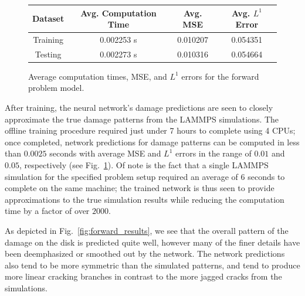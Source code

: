 \begin{figure}
  \centering
  \begin{tabular}{c|c|c|c}
    Dataset  &  Avg. Computation Time  & Avg. MSE &  Avg. $L^1$ Error \\ \hline
    Training &    0.002253 s &    0.010207  &   0.054351  \\ 
    Testing  &    0.002273 s &    0.010316  &   0.054664  
  \end{tabular}
  \caption{Average computation times, MSE, and $L^1$ errors for the forward problem model.}
  \label{fig:forward_results_table}
\end{figure}


After training, the neural network's damage predictions are seen to closely approximate the true damage patterns from the LAMMPS simulations.  The offline training procedure required just under 7 hours to complete using 4 CPUs; once completed, network predictions for damage patterns can be computed in less than $0.0025$ seconds with average MSE and $L^1$ errors in the range of $0.01$ and $0.05$, respectively (see Fig.~\ref{fig:forward_results_table}).  Of note is the fact that a single LAMMPS simulation for the specified problem setup required an average of $6$ seconds to complete on the same machine;  the trained network is thus seen to  provide approximations to the true simulation results while reducing the computation time  by a factor of over $2000$.

As depicted in Fig.~\ref{fig:forward_results}, we see that the overall pattern of the damage on the disk is predicted quite well, however many of the finer details have been deemphasized or smoothed out by the network.  The network predictions also tend to be more symmetric than the simulated patterns, and tend to produce more linear cracking branches in contrast to the more jagged cracks from the simulations.


